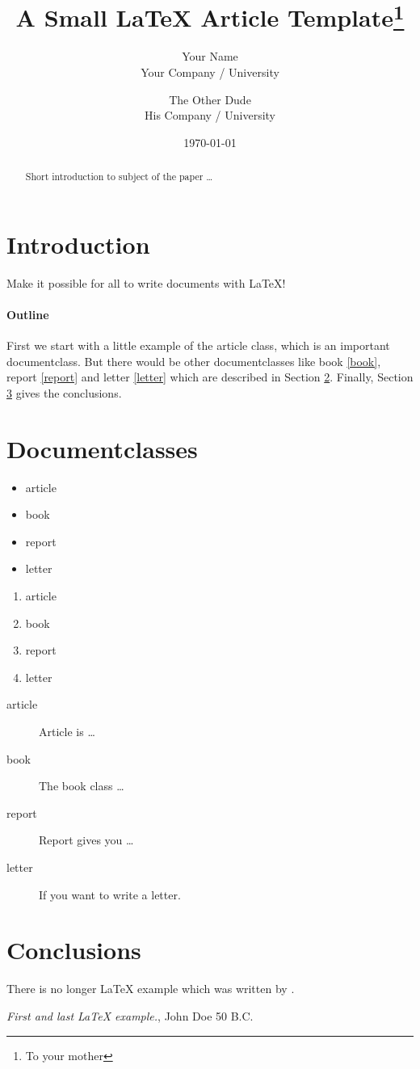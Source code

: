 \documentclass{article}
\title{A Small \LaTeX{} Article Template\thanks{To your mother}}
\author{Your Name  \\
	Your Company / University  \\
	\and 
	The Other Dude \\
	His Company / University \\
}
\date{\today}
\begin{document}
			
			\maketitle
			
			
			\begin{abstract}
				Short introduction to subject of the paper \ldots 
			\end{abstract}
			
			\section{Introduction}
			Make it possible for all to write documents with \LaTeX{}!
			
			\paragraph{Outline}
			First we start with a little example of the article class, which is an 
			important documentclass. But there would be other documentclasses like 
			book \ref{book}, report \ref{report} and letter \ref{letter} which are 
			described in Section \ref{documentclasses}. Finally, Section 
			\ref{conclusions} gives the conclusions.
			
			
			
			\section{Documentclasses} \label{documentclasses}
			
			\begin{itemize}
				\item article
				\item book 
				\item report 
				\item letter 
			\end{itemize}
			
			
			\begin{enumerate}
				\item article
				\item book 
				\item report 
				\item letter 
			\end{enumerate}
			
			\begin{description}
				\item[article\label{article}]{Article is \ldots}
				\item[book\label{book}]{The book class \ldots}
				\item[report\label{report}]{Report gives you \ldots}
				\item[letter\label{letter}]{If you want to write a letter.}
			\end{description}
			
			
			\section{Conclusions}\label{conclusions}
			There is no longer \LaTeX{} example which was written by \cite{doe}.
			
			
			\begin{thebibliography}{9}
				 \emph{First and last \LaTeX{} example.},
				John Doe 50 B.C. 
			\end{thebibliography}
			
		
\end{document}
